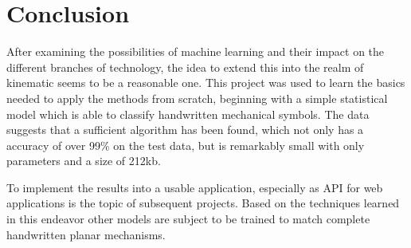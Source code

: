 \section{Conclusion}

After examining the possibilities of machine learning and their impact on the different branches of technology, the idea to extend this into the realm of kinematic seems to be a reasonable one.
This project was used to learn the basics needed to apply the methods from scratch, beginning with a simple statistical model which is able to classify handwritten mechanical symbols.
The data suggests that a sufficient algorithm has been found, which not only has a accuracy of over 99\% on the test data, but is remarkably small with only %
parameters and a size of 212kb.

To implement the results into a usable application, especially as API for web applications %
is the topic of subsequent projects.
Based on the techniques learned in this endeavor other models are subject to be trained to match complete handwritten planar mechanisms. 
